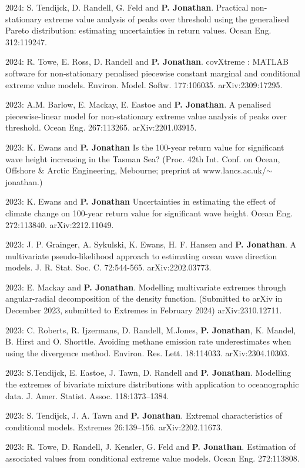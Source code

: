 \documentclass[11pt,a4paper]{moderncv}
\begin{document}
2024: S. Tendijck, D. Randell, G. Feld and \textbf{P. Jonathan}. Practical non-stationary extreme value analysis of peaks over threshold using the generalised Pareto distribution: estimating uncertainties in return values. Ocean Eng. 312:119247.

2024: R. Towe, E. Ross, D. Randell and \textbf{P. Jonathan}. covXtreme : MATLAB software for non-stationary penalised piecewise constant marginal and conditional extreme value models. Environ. Model. Softw. 177:106035. arXiv:2309:17295.

2023:  A.M. Barlow, E. Mackay, E. Eastoe and \textbf{P. Jonathan}. A penalised piecewise-linear model for non-stationary extreme value analysis of peaks over threshold. Ocean Eng. 267:113265. arXiv:2201.03915.

2023: K. Ewans and \textbf{P. Jonathan} Is the 100-year return value for significant wave height increasing in the Tasman Sea? (Proc. 42th Int. Conf. on Ocean, Offshore \& Arctic Engineering, Mebourne; preprint at  www.lancs.ac.uk/$\sim$jonathan.)

2023: K. Ewans and \textbf{P. Jonathan} Uncertainties in estimating the effect of climate change on 100-year return value for significant wave height. Ocean Eng. 272:113840. arXiv:2212.11049.

2023: J. P. Grainger, A. Sykulski, K. Ewans, H. F. Hansen and \textbf{P. Jonathan}. A multivariate pseudo-likelihood approach to estimating ocean wave direction models. J. R. Stat. Soc. C. 72:544-565.  arXiv:2202.03773.

2023: E. Mackay and \textbf{P. Jonathan}. Modelling multivariate extremes through angular-radial decomposition of the density function. (Submitted to arXiv in December 2023, submitted to Extremes in February 2024) arXiv:2310.12711.

2023: C. Roberts, R. Ijzermans, D. Randell, M.Jones, \textbf{P. Jonathan}, K. Mandel, B. Hirst and O. Shorttle. Avoiding methane emission rate underestimates when using the divergence method. Environ. Res. Lett. 18:114033. arXiv:2304.10303.

2023: S.Tendijck, E. Eastoe, J. Tawn, D. Randell and \textbf{P. Jonathan}. Modelling the extremes of bivariate mixture distributions with application to oceanographic data. J. Amer. Statist. Assoc. 118:1373--1384.

2023: S. Tendijck, J. A. Tawn and \textbf{P. Jonathan}. Extremal characteristics of conditional models. Extremes 26:139–156. arXiv:2202.11673.

2023: R. Towe, D. Randell, J. Kensler, G. Feld and \textbf{P. Jonathan}. Estimation of associated values from conditional extreme value models. Ocean Eng. 272:113808.
\end{document}
